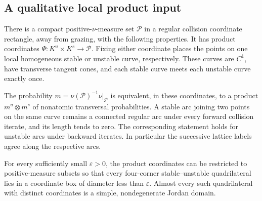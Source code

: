 \subsection{A qualitative local product input}
\begin{lemma}
\label{lem:regular-collision-product}
There is a compact positive-$\nu$-measure set $\mathcal P$ in a regular
collision coordinate rectangle, away from grazing, with the following
properties. It has product coordinates
$\Psi:K^u\times K^s\longrightarrow\mathcal P$. Fixing either coordinate
places the points on one local homogeneous stable or unstable curve,
respectively. These curves are $C^1$, have transverse tangent cones,
and each stable curve meets each unstable curve exactly once.

The probability $m=\nu(\mathcal P)^{-1}\nu|_{\mathcal P}$ is equivalent,
in these coordinates, to a product $m^u\otimes m^s$ of nonatomic
transversal probabilities. A stable arc joining two points on the same
curve remains a connected regular arc under every forward collision
iterate, and its length tends to zero. The corresponding statement
holds for unstable arcs under backward iterates. In particular the
successive lattice labels agree along the respective arcs.

For every sufficiently small $\varepsilon>0$, the product coordinates
can be restricted to positive-measure subsets so that every four-corner
stable--unstable quadrilateral lies in a coordinate box of diameter
less than $\varepsilon$. Almost every such quadrilateral with distinct
coordinates is a simple, nondegenerate Jordan domain.
\end{lemma}
